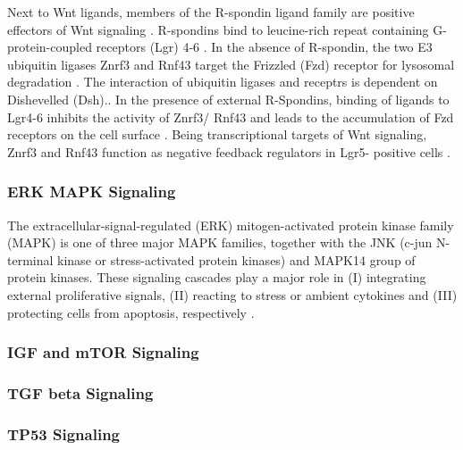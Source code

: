 \begin{flushleft}
Next to Wnt ligands, members of the R-spondin ligand family are positive effectors of Wnt signaling \cite{Kazanskaya2004, Glinka2011, Hao2012}. R-spondins bind to leucine-rich repeat containing G-protein-coupled receptors (Lgr) 4-6 \cite{Koo2012a}. In the absence of R-spondin, the two E3 ubiquitin ligases Znrf3 and Rnf43 target the Frizzled (Fzd) receptor for lysosomal degradation \cite{DeLau2011}. The interaction of ubiquitin ligases and receptrs is dependent on Dishevelled (Dsh).\cite{Jiang2015}. In the presence of external R-Spondins, binding of ligands to Lgr4-6 inhibits the activity of Znrf3/ Rnf43 and leads to the accumulation of Fzd receptors on the cell surface \cite{Hao2012, Koo2012a}. Being transcriptional targets of Wnt signaling, Znrf3 and Rnf43 function as negative feedback regulators in Lgr5- positive cells \cite{DeLau2012}. \par 


\subsubsection{ERK MAPK Signaling}
The extracellular-signal-regulated (ERK) mitogen-activated protein kinase family (MAPK) is one of three major MAPK families, together with the JNK (c-jun N-terminal kinase or stress-activated protein kinases) and MAPK14 group of protein kinases. These signaling cascades play a major role in (I) integrating external proliferative signals, (II) reacting to stress or ambient cytokines and (III) protecting cells from apoptosis, respectively \cite{Oncol2005}. 


\subsubsection{IGF and mTOR Signaling}

\subsubsection{TGF beta Signaling}

\subsubsection{TP53 Signaling}


\end{flushleft}
